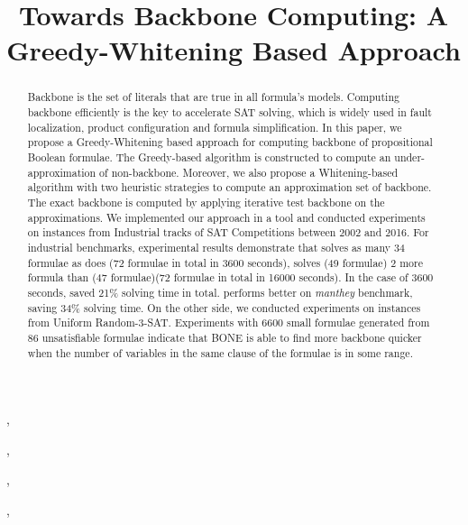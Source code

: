 \documentclass{IOS-Book-Article}
\def\hb{\hbox to 10.7 cm{}}
\begin{document}
\pagestyle{headings}
\def\thepage{}

\begin{frontmatter}              %


\title{Towards Backbone Computing: A Greedy-Whitening Based Approach}

\markboth{}{January 2017\hb}

\author[A]{ 
},
\author[A]{ }
,
\author[A]{ }
,
\author[B]{ }
,
\author[A]{ }

\address[A]{National Research Center of Trustworthy Embedded Software
        \\ East China Normal University, China}
\address[B]{School of Information Science and Technology ShanghaiTech University, China}

\begin{abstract}
Backbone is the set of literals that are true in all formula's models.  Computing backbone efficiently is the key to accelerate SAT solving, which is widely used in fault localization, product configuration and formula simplification.
In this paper, we propose a Greedy-Whitening based approach for computing backbone of propositional Boolean formulae.
The Greedy-based algorithm is constructed to compute an under-approximation of non-backbone. Moreover, we also propose
a Whitening-based algorithm with two heuristic strategies to compute an approximation set of backbone.
The exact backbone is computed by applying iterative test backbone on the approximations.
We implemented our approach in a tool \tool and conducted experiments on instances from Industrial tracks of SAT Competitions
between 2002 and 2016. For industrial benchmarks, experimental results demonstrate that \tool solves as many 34 formulae as \minibones does (72 formulae in total in 3600 seconds), solves (49 formulae)  2 more formula than \minibones(47 formulae)(72 formulae in total in 16000 seconds).   In the case of 3600 seconds, \tool saved 21\% solving time in total.
\tool performs better on \textit{manthey} benchmark, saving 34\% solving time.
On the other side, we conducted experiments on instances from Uniform Random-3-SAT.
Experiments with 6600 small formulae generated from 86 unsatisfiable formulae indicate that BONE is able to find more backbone quicker when the number of variables in the same clause of the formulae is in some range.
\end{abstract}


\end{frontmatter}
\end{document}
